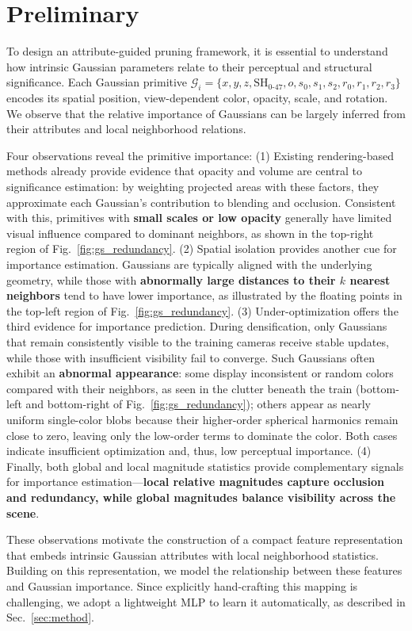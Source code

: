 \section{Preliminary}
\label{sec:preliminary}

To design an attribute-guided pruning framework, it is essential to understand how intrinsic Gaussian parameters relate to their perceptual and structural significance. Each Gaussian primitive $\mathcal{G}_i = \{x, y, z, \text{SH}_{0\text{-}47}, o, s_0, s_1, s_2, r_0, r_1, r_2, r_3\}$ encodes its spatial position, view-dependent color, opacity, scale, and rotation.  We observe that the relative importance of Gaussians can be largely inferred from their attributes and local neighborhood relations. 

Four observations reveal the primitive importance: (1) Existing rendering-based methods already provide evidence that opacity and volume are central to significance estimation: by weighting projected areas with these factors, they approximate each Gaussian’s contribution to blending and occlusion. Consistent with this, primitives with \textbf{small scales or low opacity} generally have limited visual influence compared to dominant neighbors, as shown in the top-right region of Fig.~\ref{fig:gs_redundancy}.
(2) Spatial isolation provides another cue for importance estimation. Gaussians are typically aligned with the underlying geometry, while those with \textbf{abnormally large distances to their $k$ nearest neighbors} tend to have lower importance, as illustrated by the floating points in the top-left region of Fig.~\ref{fig:gs_redundancy}.
(3) Under-optimization offers the third evidence for importance prediction. During densification, only Gaussians that remain consistently visible to the training cameras receive stable updates, while those with insufficient visibility fail to converge. Such Gaussians often exhibit an \textbf{abnormal appearance}: some display inconsistent or random colors compared with their neighbors, as seen in the clutter beneath the train (bottom-left and bottom-right of Fig.~\ref{fig:gs_redundancy}); others appear as nearly uniform single-color blobs because their higher-order spherical harmonics remain close to zero, leaving only the low-order terms to dominate the color. Both cases indicate insufficient optimization and, thus, low perceptual importance.
(4) Finally, both global and local magnitude statistics provide complementary signals for importance estimation—\textbf{local relative magnitudes capture occlusion and redundancy, while global magnitudes balance visibility across the scene}.

These observations motivate the construction of a compact feature representation that embeds intrinsic Gaussian attributes with local neighborhood statistics.
Building on this representation, we model the relationship between these features and Gaussian importance. Since explicitly hand-crafting this mapping is challenging, we adopt a lightweight MLP to learn it automatically, as described in Sec.~\ref{sec:method}.